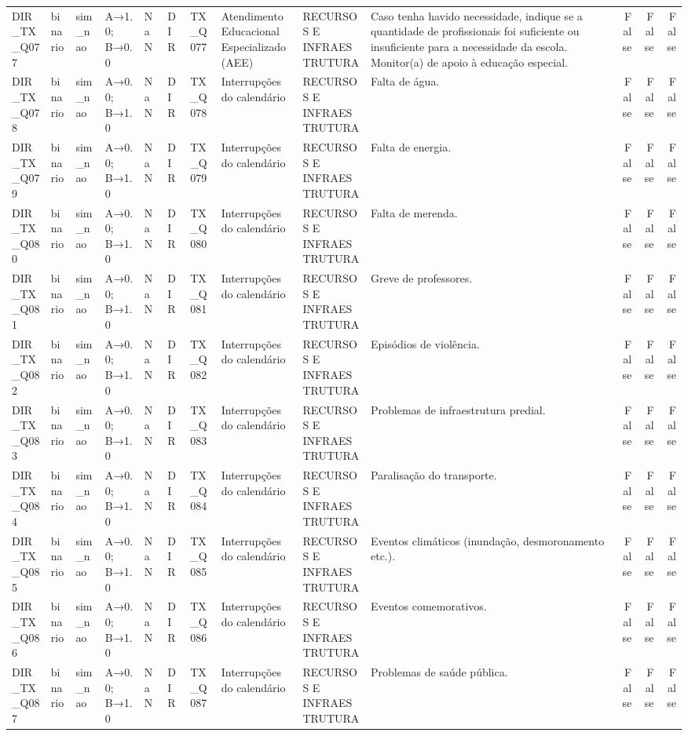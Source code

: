 \begin{tabular}{llllllllllrrr}
DIR\_TX\_Q077 & binario & sim\_nao & A→1.0; B→0.0 & NaN & DIR & TX\_Q077 & Atendimento Educacional Especializado (AEE) & RECURSOS E INFRAESTRUTURA & Caso tenha havido necessidade, indique se a quantidade de profissionais foi suficiente ou insuficiente para a necessidade da escola. Monitor(a) de apoio à educação especial. & False & False & False \\
DIR\_TX\_Q078 & binario & sim\_nao & A→0.0; B→1.0 & NaN & DIR & TX\_Q078 & Interrupções do calendário & RECURSOS E INFRAESTRUTURA & Falta de água. & False & False & False \\
DIR\_TX\_Q079 & binario & sim\_nao & A→0.0; B→1.0 & NaN & DIR & TX\_Q079 & Interrupções do calendário & RECURSOS E INFRAESTRUTURA & Falta de energia. & False & False & False \\
DIR\_TX\_Q080 & binario & sim\_nao & A→0.0; B→1.0 & NaN & DIR & TX\_Q080 & Interrupções do calendário & RECURSOS E INFRAESTRUTURA & Falta de merenda. & False & False & False \\
DIR\_TX\_Q081 & binario & sim\_nao & A→0.0; B→1.0 & NaN & DIR & TX\_Q081 & Interrupções do calendário & RECURSOS E INFRAESTRUTURA & Greve de professores. & False & False & False \\
DIR\_TX\_Q082 & binario & sim\_nao & A→0.0; B→1.0 & NaN & DIR & TX\_Q082 & Interrupções do calendário & RECURSOS E INFRAESTRUTURA & Episódios de violência. & False & False & False \\
DIR\_TX\_Q083 & binario & sim\_nao & A→0.0; B→1.0 & NaN & DIR & TX\_Q083 & Interrupções do calendário & RECURSOS E INFRAESTRUTURA & Problemas de infraestrutura predial. & False & False & False \\
DIR\_TX\_Q084 & binario & sim\_nao & A→0.0; B→1.0 & NaN & DIR & TX\_Q084 & Interrupções do calendário & RECURSOS E INFRAESTRUTURA & Paralisação do transporte. & False & False & False \\
DIR\_TX\_Q085 & binario & sim\_nao & A→0.0; B→1.0 & NaN & DIR & TX\_Q085 & Interrupções do calendário & RECURSOS E INFRAESTRUTURA & Eventos climáticos (inundação, desmoronamento etc.). & False & False & False \\
DIR\_TX\_Q086 & binario & sim\_nao & A→0.0; B→1.0 & NaN & DIR & TX\_Q086 & Interrupções do calendário & RECURSOS E INFRAESTRUTURA & Eventos comemorativos. & False & False & False \\
DIR\_TX\_Q087 & binario & sim\_nao & A→0.0; B→1.0 & NaN & DIR & TX\_Q087 & Interrupções do calendário & RECURSOS E INFRAESTRUTURA & Problemas de saúde pública. & False & False & False \\

\end{tabular}
